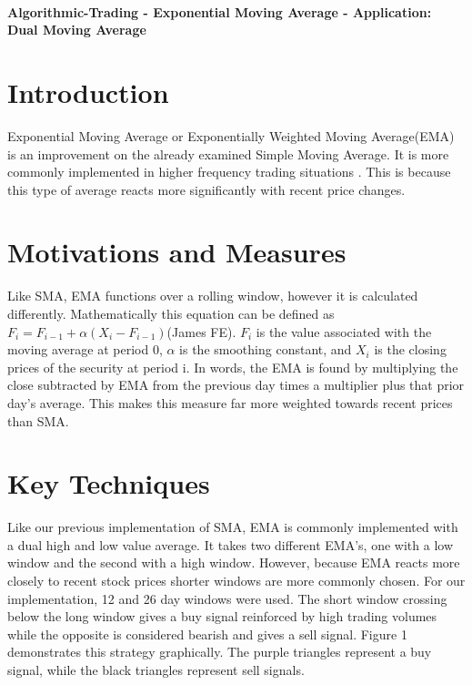 \documentclass[letterpaper,11pt]{article}
\begin{document}
\thispagestyle{plain}


 \\

\noindent\textbf{Algorithmic-Trading - Exponential Moving Average - Application: Dual Moving Average}

\section*{Introduction }

Exponential Moving Average or Exponentially Weighted Moving Average(EMA) is an improvement on the already examined Simple Moving Average. It is more commonly implemented in higher frequency trading situations \cite{James1968}. This is because this type of average reacts more significantly with recent price changes. 

\section*{Motivations and Measures}

Like SMA, EMA functions over a rolling window, however it is calculated differently. Mathematically this equation can be defined as  $F_i = F_{i-1} +\alpha(X_i - F_{i-1})$(James FE). $F_i$ is the value associated with the moving average at period 0, $\alpha$ is the smoothing constant, and $X_i$ is the closing prices of the security at period i. In words, the EMA is found by multiplying the close subtracted by EMA from the previous day times a multiplier plus that prior day's average. This makes this measure far more weighted towards recent prices than SMA. 

\section*{Key Techniques}

Like our previous implementation of SMA, EMA is commonly implemented with a dual high and low value average. It takes two different EMA's, one with a low window and the second with a high window. However, because EMA reacts more closely to recent stock prices shorter windows are more commonly chosen. For our implementation, 12 and 26 day windows were used. The short window crossing below the long window gives a buy signal reinforced by high trading volumes while the opposite is considered bearish and gives a sell signal. Figure 1 demonstrates this strategy graphically. The purple triangles represent a buy signal, while the black triangles represent sell signals.
\end{document}
